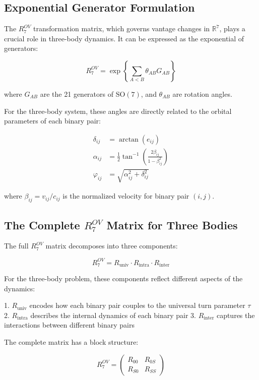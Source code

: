 \documentclass{article}
\begin{document}
\subsection{Exponential Generator Formulation}

The $R^{OV}_7$ transformation matrix, which governs vantage changes in $\mathbb{R}^7$, plays a crucial role in three-body dynamics. It can be expressed as the exponential of generators:

\begin{equation}
R^{OV}_7 = \exp\left\{\sum_{A<B} \theta_{AB} G_{AB}\right\}
\end{equation}

where $G_{AB}$ are the 21 generators of $\text{SO}(7)$, and $\theta_{AB}$ are rotation angles.

For the three-body system, these angles are directly related to the orbital parameters of each binary pair:

\begin{align}
\delta_{ij} &= \arctan(e_{ij}) \\
\alpha_{ij} &= \frac{1}{2}\tan^{-1}\left(\frac{2\beta_{ij}}{1-\beta_{ij}^2}\right) \\
\varphi_{ij} &= \sqrt{\alpha_{ij}^2 + \delta_{ij}^2}
\end{align}

where $\beta_{ij} = v_{ij}/c_{ij}$ is the normalized velocity for binary pair $(i,j)$.

\subsection{The Complete $R^{OV}_7$ Matrix for Three Bodies}

The full $R^{OV}_7$ matrix decomposes into three components:

\begin{equation}
R^{OV}_7 = R_{\text{univ}} \cdot R_{\text{intra}} \cdot R_{\text{inter}}
\end{equation}

For the three-body problem, these components reflect different aspects of the dynamics:

1. $R_{\text{univ}}$ encodes how each binary pair couples to the universal turn parameter $\tau$
2. $R_{\text{intra}}$ describes the internal dynamics of each binary pair
3. $R_{\text{inter}}$ captures the interactions between different binary pairs

The complete matrix has a block structure:

\begin{equation}
R^{OV}_7 = 
\begin{pmatrix}
R_{00} & R_{0S} \\
R_{S0} & R_{SS}
\end{pmatrix}
\end{equation}
\end{document}

